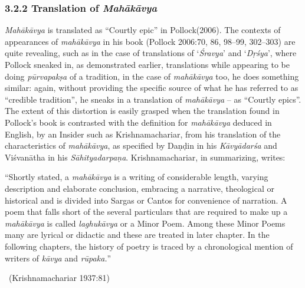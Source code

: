 \subsubsection*{3.2.2 Translation of \textit{Mahākāvya}}

\textit{Mahākāvya} is translated as “Courtly epic” in Pollock(2006). The contexts of appearances of \textit{mahākāvya} in his book (Pollock 2006:70, 86, 98–99, 302–303) are quite revealing, such as in the case of translations of ‘\textit{Śravya}’ and ‘\textit{Dṛśya}’, where Pollock sneaked in, as demonstrated earlier, translations while appearing to be doing \textit{pūrvapakṣa} of a tradition, in the case of \textit{mahākāvya} too, he does something similar: again, without providing the specific source of what he has referred to as “credible tradition”, he sneaks in a translation of \textit{mahākāvya} – as “Courtly epics”. The extent of this distortion is easily grasped when the translation found in Pollock’s book is contrasted with the definition for \textit{mahākāvya} deduced in English, by an Insider such as Krishnamachariar, from his translation of the characteristics of \textit{mahākāvya}, as specified by Daṇḍin in his \textit{Kāvyādarśa} and Viśvanātha in his \textit{Sāhityadarpaṇa}. Krishnamachariar, in summarizing, writes:

\begin{myquote}
“Shortly stated, a \textit{mahākāvya} is a writing of considerable length, varying description and elaborate conclusion, embracing a narrative, theological or historical and is divided into Sargas or Cantos for convenience of narration. A poem that falls short of the several particulars that are required to make up a \textit{mahākāvya} is called \textit{laghukāvya} or a Minor Poem. Among these Minor Poems many are lyrical or didactic and these are treated in later chapter. In the following chapters, the history of poetry is traced by a chronological mention of writers of \textit{kāvya} and \textit{rūpaka.}” 

~\hfill (Krishnamachariar 1937:81)
\end{myquote}

